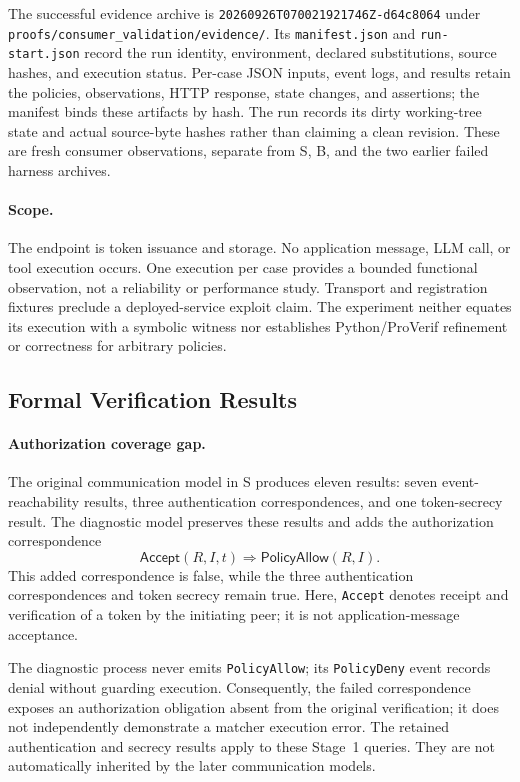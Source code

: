 The successful evidence archive is
\texttt{20260926T070021921746Z-d64c8064} under
\texttt{proofs/consumer\_validation/evidence/}.
Its \texttt{manifest.json} and \texttt{run-start.json} record the run identity,
environment, declared substitutions, source hashes, and execution status.
Per-case JSON inputs, event logs, and results retain the policies,
observations, HTTP response, state changes, and
assertions; the manifest binds these artifacts by hash. The run records
its dirty working-tree state and actual source-byte hashes rather than
claiming a clean revision. These are fresh consumer observations, separate
from S, B, and the two earlier failed harness archives.

\paragraph{Scope.}
The endpoint is token issuance and storage. No application message,
LLM call, or tool execution occurs. One execution per case provides a
bounded functional observation, not a reliability or performance study.
Transport and registration fixtures preclude a deployed-service exploit
claim. The experiment neither equates its execution with a symbolic
witness nor establishes Python/ProVerif refinement or correctness for
arbitrary policies.

\subsection{Formal Verification Results}

\paragraph{Authorization coverage gap.}
The original communication model in S produces eleven results: seven
event-reachability results, three authentication correspondences, and one
token-secrecy result. The diagnostic model preserves these results and
adds the authorization correspondence
\[
\mathsf{Accept}(R,I,t)\Longrightarrow\mathsf{PolicyAllow}(R,I).
\]
This added correspondence is false, while the three authentication
correspondences and token secrecy remain true. Here, \texttt{Accept}
denotes receipt and verification of a token by the initiating peer;
it is not application-message acceptance.

The diagnostic process never emits \texttt{PolicyAllow}; its
\texttt{PolicyDeny} event records denial without guarding execution. Consequently,
the failed correspondence exposes an authorization obligation absent from
the original verification; it does not independently demonstrate a
matcher execution error. The retained authentication and secrecy results
apply to these Stage~1 queries. They are not automatically inherited by
the later communication models.

